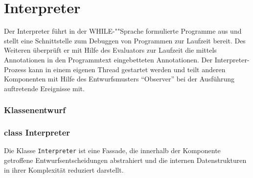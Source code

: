 \section{Interpreter}

Der Interpreter führt in der WHILE-""Sprache formulierte Programme aus und stellt eine Schnittstelle zum Debuggen von Programmen zur Laufzeit bereit. Des Weiteren überprüft er mit Hilfe des Evaluators zur Laufzeit die mittels Annotationen in den Programmtext eingebetteten Annotationen. Der Interpreter-Prozess kann in einem eigenen Thread gestartet werden und teilt anderen Komponenten mit Hilfe des Entwurfsmusters ``Observer'' bei der Ausführung auftretende Ereignisse mit.

\subsubsection{Klassenentwurf}

\subsubsection{class Interpreter}
Die Klasse \texttt{Interpreter} ist eine Fassade, die innerhalb der Komponente getroffene Entwurfsentscheidungen abstrahiert und die internen Datenstrukturen in ihrer Komplexität reduziert darstellt.

